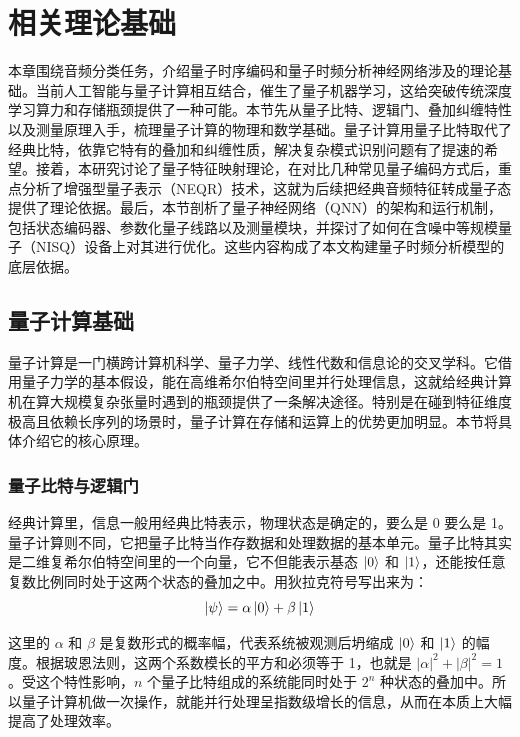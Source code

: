 
\section{相关理论基础}
本章围绕音频分类任务，介绍量子时序编码和量子时频分析神经网络涉及的理论基础。当前人工智能与量子计算相互结合，催生了量子机器学习，这给突破传统深度学习算力和存储瓶颈提供了一种可能。本节先从量子比特、逻辑门、叠加纠缠特性以及测量原理入手，梳理量子计算的物理和数学基础。量子计算用量子比特取代了经典比特，依靠它特有的叠加和纠缠性质，解决复杂模式识别问题有了提速的希望。接着，本研究讨论了量子特征映射理论，在对比几种常见量子编码方式后，重点分析了增强型量子表示（NEQR）技术，这就为后续把经典音频特征转成量子态提供了理论依据。最后，本节剖析了量子神经网络（QNN）的架构和运行机制，包括状态编码器、参数化量子线路以及测量模块，并探讨了如何在含噪中等规模量子（NISQ）设备上对其进行优化。这些内容构成了本文构建量子时频分析模型的底层依据。
\subsection{量子计算基础}
量子计算是一门横跨计算机科学、量子力学、线性代数和信息论的交叉学科。它借用量子力学的基本假设，能在高维希尔伯特空间里并行处理信息，这就给经典计算机在算大规模复杂张量时遇到的瓶颈提供了一条解决途径。特别是在碰到特征维度极高且依赖长序列的场景时，量子计算在存储和运算上的优势更加明显。本节将具体介绍它的核心原理。

\subsubsection{量子比特与逻辑门}
经典计算里，信息一般用经典比特表示，物理状态是确定的，要么是 0 要么是 1。量子计算则不同，它把量子比特当作存数据和处理数据的基本单元。量子比特其实是二维复希尔伯特空间里的一个向量，它不但能表示基态 $\ket{0}$ 和 $\ket{1}$，还能按任意复数比例同时处于这两个状态的叠加之中。用狄拉克符号写出来为：
\begin{equation}
	\ket{\psi} = \alpha\ket{0} + \beta\ket{1} 
\end{equation}

这里的 $\alpha$ 和 $\beta$ 是复数形式的概率幅，代表系统被观测后坍缩成 $\ket{0}$ 和 $\ket{1}$ 的幅度。根据玻恩法则，这两个系数模长的平方和必须等于 1，也就是 $|\alpha|^2 + |\beta|^2 = 1$。受这个特性影响，$n$ 个量子比特组成的系统能同时处于 $2^n$ 种状态的叠加中。所以量子计算机做一次操作，就能并行处理呈指数级增长的信息，从而在本质上大幅提高了处理效率。

